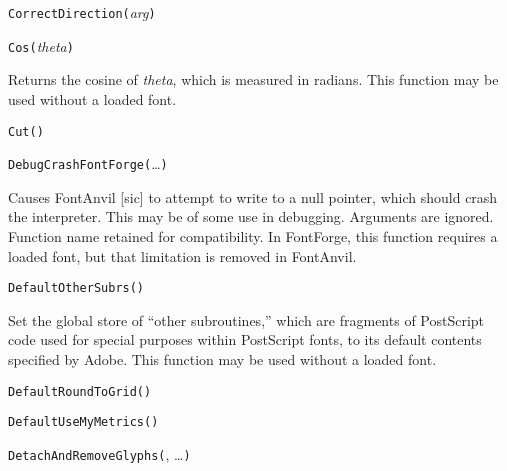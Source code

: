 

\texttt{CorrectDirection(}\textit{arg}\texttt{)}



\texttt{Cos(}\textit{theta}\texttt{)}

Returns the cosine of \textit{theta}, which is measured in radians.
This function may be used without a loaded font.



\texttt{Cut(}\texttt{)}



\texttt{DebugCrashFontForge(}\ldots\texttt{)}

Causes FontAnvil [sic] to attempt to write to a null pointer, which should
crash the interpreter.  This may be of some use in debugging.  Arguments are
ignored.  Function name retained for compatibility.  In \FFdiff FontForge,
this function requires a loaded font, but that limitation is removed in
FontAnvil.



\texttt{DefaultOtherSubrs(}\texttt{)}

Set the global store of ``other subroutines,'' which are fragments of
PostScript code used for special purposes within PostScript fonts, to its
default contents specified by Adobe.  This function may be used without a
loaded font.



\texttt{DefaultRoundToGrid(}\texttt{)}



\texttt{DefaultUseMyMetrics(}\texttt{)}



\texttt{DetachAndRemoveGlyphs(}, \ldots\texttt{)}

